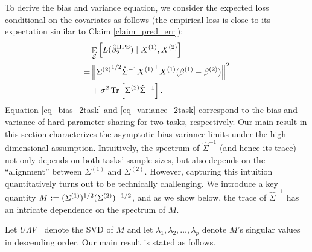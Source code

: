 To derive the bias and variance equation, we consider the expected loss conditional on the covariates as follows (the empirical loss is close to its expectation similar to Claim \ref{claim_pred_err}):
\begin{align}
	& \mathop{\mathbb{E}}_{\mathcal{E}}\left[ L(\hat{\beta}_2^{\textup{HPS}}) \mid X^{(1)}, X^{(2)} \right]  \nonumber \\
	=& \left\| {\Sigma^{(2)}}^{1/2} \hat{\Sigma}^{-1} {X^{(1)}}^{\top} X^{(1)} (\beta^{(1)} - \beta^{(2)}) \right\|^2 \label{eq_bias_2task} \\
	& + \sigma^2 \operatorname{Tr}\left[\Sigma^{(2)}\hat{\Sigma}^{-1}\right]. \label{eq_variance_2task}
\end{align}
Equation \eqref{eq_bias_2task} and \eqref{eq_variance_2task} correspond to the bias and variance of hard parameter sharing for two tasks, respectively.
Our main result in this section characterizes the asymptotic bias-variance limits under the high-dimensional assumption.
Intuitively, the spectrum of $\hat{\Sigma}^{-1}$ (and hence its trace) not only depends on both tasks' sample sizes, but also depends on the ``alignment'' between $\Sigma^{(1)}$ and $\Sigma^{(2)}$.
However, capturing this intuition quantitatively turns out to be technically challenging.
We introduce a key quantity $M := (\Sigma^{(1)})^{1/2}(\Sigma^{(2)})^{-1/2}$, and as we show below, the trace of $\hat{\Sigma}^{-1}$ has an intricate dependence on the spectrum of $M$.

Let $U\Lambda V^\top$ denote the SVD of $M$ and let $\lambda_1, \lambda_2, \dots, \lambda_p$ denote $M$'s singular values in descending order.
Our main result is stated as follows.

